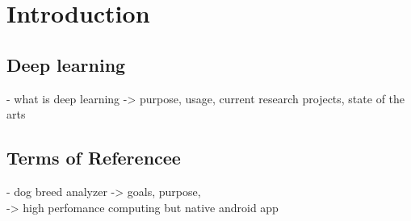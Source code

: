 \section{Introduction}
	\subsection{Deep learning}
		- what is deep learning -> purpose, usage, current research projects, state of the arts
	\subsection{Terms of Referencee}
		- dog breed analyzer -> goals, purpose, \\
		-> high perfomance computing but native android app
	